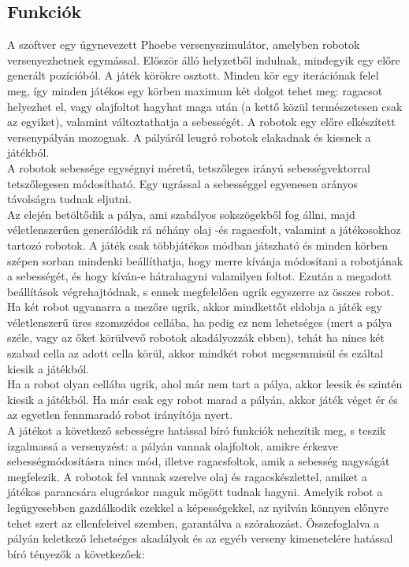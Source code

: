 \subsection{Funkciók}

A szoftver egy úgynevezett Phoebe versenyszimulátor, amelyben robotok versenyezhetnek egymással. Először álló helyzetből indulnak, mindegyik egy előre generált pozícióból. A játék körökre osztott. Minden kör egy iterációnak felel meg, így minden játékos egy körben maximum két dolgot tehet meg: ragacsot helyezhet el, vagy olajfoltot hagyhat maga után (a kettő közül természetesen csak az egyiket), valamint változtathatja a sebességét. A robotok egy előre elkészített versenypályán mozognak. A pályáról leugró robotok elakadnak és kiesnek a játékból.\\

A robotok sebessége egységnyi méretű, tetszőleges irányú sebességvektorral tetszőlegesen módosítható. Egy ugrással a sebességgel egyenesen arányos távolságra tudnak eljutni.\\

Az elején betöltődik a pálya, ami szabályos sokszögekből fog állni, majd véletlenszerűen generálódik rá néhány olaj -és ragacsfolt, valamint a játékosokhoz tartozó robotok. A játék csak többjátékos módban játszható és minden körben szépen sorban mindenki beállíthatja, hogy merre kívánja módosítani a robotjának a sebességét, és hogy kíván-e hátrahagyni valamilyen foltot. Ezután a megadott beállítások végrehajtódnak, s ennek megfelelően ugrik egyszerre az összes robot. Ha két robot ugyanarra a mezőre ugrik, akkor mindkettőt eldobja a játék egy véletlenszerű üres szomszédos cellába, ha pedig ez nem lehetséges (mert a pálya széle, vagy az őket körülvevő robotok akadályozzák ebben), tehát ha nincs két szabad cella az adott cella körül, akkor mindkét robot megsemmisül és ezáltal kiesik a játékból.\\

Ha a robot olyan cellába ugrik, ahol már nem tart a pálya, akkor leesik és szintén kiesik a játékból. Ha már csak egy robot marad a pályán, akkor játék véget ér és az egyetlen fennmaradó robot irányítója nyert.\\

A játékot a következő sebességre hatással bíró funkciók nehezítik meg, s teszik izgalmassá a versenyzést: a pályán vannak olajfoltok, amikre érkezve sebességmódosításra nincs mód, illetve ragacsfoltok, amik a sebesség nagyságát megfelezik. A robotok fel vannak szerelve olaj és ragacskészlettel, amiket a játékos parancsára elugráskor maguk mögött tudnak hagyni. Amelyik robot a legügyesebben gazdálkodik ezekkel a képességekkel, az nyilván könnyen előnyre tehet szert az ellenfeleivel szemben, garantálva a szórakozást. Összefoglalva a pályán keletkező lehetséges akadályok és az egyéb verseny kimenetelére hatással bíró tényezők a következőek:\\

